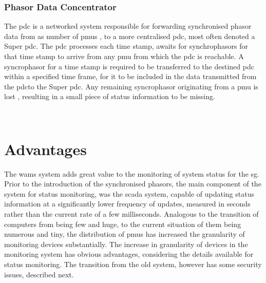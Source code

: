 \subsubsection{Phasor Data Concentrator}

The \acrfull{pdc} is a networked system responsible for forwarding synchronised phasor data from as number of \acrshort{pmu}s 
, to a more centralised \acrshort{pdc}, most often denoted a Super \acrshort{pdc}. The \acrshort{pdc} processes each time stamp, awaits for synchrophasors for that time stamp to arrive from any \acrshort{pmu} from which the \acrshort{pdc} is reachable. A syncrophasor for a time stamp is required to be transferred to the destined \acrshort{pdc} within a specified time frame, for it to be included in the data transmitted from the \acrshort{pdc}to the Super \acrshort{pdc}. Any remaining syncrophasor originating from a \acrshort{pmu} is lost
, resulting in a small piece of status information to be missing. 

\
 






\section{Advantages}
The \acrshort{wams} system adds great value to the monitoring of system status for the \acrlong{sg}. Prior to the introduction of the synchronised phasors, the main component of the system for status monitoring, was the \acrshort{scada} system, capable of updating status information at a significantly lower frequency of updates, measured in seconds rather than the current rate of a few milliseconds. Analogous to the transition of computers from being few and huge, to the current situation of them being numerous and tiny, the distribution of \acrshort{pmu}s has increased the granularity of monitoring devices substantially.
The increase in granularity of devices in the monitoring system has obvious advantages, considering the details available for status monitoring. The transition from the old system, however has some security issues, described next.

